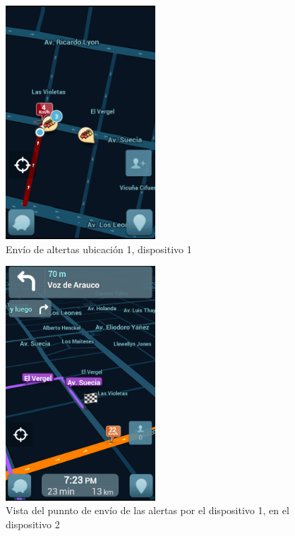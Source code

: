   
    
   \begin{figure}[H]
  \begin{center}
    \includegraphics[width=0.5\textwidth]{imagenes/fig20.png}
     \caption{Envío de altertas ubicación 1, dispositivo 1}
  \end{center}
\end{figure}


        \begin{figure}[H]
  \begin{center}
    \includegraphics[width=0.5\textwidth]{imagenes/fig21.png}
     \caption{Vista del punnto de envío de las alertas por el dispositivo 1, en el                   dispositivo 2}
  \end{center}
\end{figure}
    
